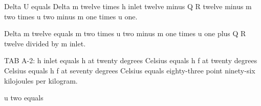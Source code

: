 Delta U equals Delta m twelve times h inlet twelve minus Q R twelve minus m two times u two minus m one times u one.  

Delta m twelve equals m two times u two minus m one times u one plus Q R twelve divided by m inlet.  

TAB A-2: h inlet equals h at twenty degrees Celsius equals h f at twenty degrees Celsius equals h f at seventy degrees Celsius equals eighty-three point ninety-six kilojoules per kilogram.  

u two equals